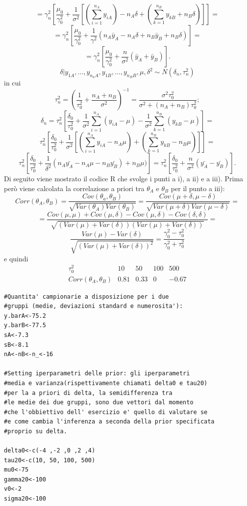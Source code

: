 \begin{itemize}[-]
\[
=\gamma_n^2[\frac{\mu_0}{\gamma_0^2}+\frac{1}{\sigma^2}[(\sum_{i=1}^{n_A}y_{iA}) - n_A\delta + (\sum_{k=1}^{n_B}y_{kB} + n_B\delta)]]=
\]
\[
= \gamma_n^2[\frac{\mu_0}{\gamma_0^2}+\frac{1}{\gamma^2}(n_A\bar{y}_A-n_A\delta+n_B\bar{y}_B+n_B\delta)] = 
\]
\[
=\gamma_n^2[\frac{\mu_0}{\gamma_0^2}+\frac{n}{\sigma^2}(\bar{y}_A+\bar{y}_B)].
\]
\[
\delta | y_{1A},\dots,y_{n_aA},y_{1B},\dots,y_{n_BB},\mu,\delta^2 \sim N(\delta_n,\tau_n^2)
\]
in cui
\[
\tau_n^2 = (\frac{1}{\tau_0^2}+\frac{n_A+n_B}{\sigma^2})^{-1} = \frac{\sigma^2\tau_0^2}{\sigma^2+(n_A+n_B)\tau_0^2};
\]
\[
\delta_n = \tau_n^2[\frac{\delta_0}{\tau_0^2}+\frac{1}{\sigma^2}\sum_{i=1}^{n_A}(y_{iA}-\mu)-\frac{1}{\sigma^2}\sum_{k=1}^{n_B}(y_{kB}-\mu)]=
\]
\[
\tau_n^2[\frac{\delta_0}{\tau_0^2}+\frac{1}{\sigma^2}[(\sum_{i=1}^{n_A}y_{iA}-n_A\mu)+(\sum_{k=1}^{n_B}y_{kB}-n_B\mu)]]=
\]
\[
\tau_n^2[\frac{\delta_0}{\tau_0^2}+\frac{1}{\delta^2}(n_A\bar{y_A}-n_A\mu-n_B\bar{y_B})+n_B\mu)]=\tau_n^2[\frac{\delta_0}{\tau_0^2}+\frac{n}{\sigma^2}(\bar{y_A}-\bar{y_B})].
\]
Di seguito viene mostrato il codice R che svolge i punti a i), a ii) e a iii). Prima però viene calcolata la correlazione a priori tra $\theta_A$ e $\theta_B$ per il punto a iii):
\[
Corr(\theta_A,\theta_B) = \frac{Cov(\theta_a,\theta_B)}{\sqrt{Var(\theta_A)Var(\theta_B)}} = \frac{Cov(\mu+\delta,\mu-\delta)}{\sqrt{Var(\mu+\delta)Var(\mu-\delta)}}=
\]
\[
= \frac{Cov(\mu,\mu)+Cov(\mu,\delta)-Cov(\mu,\delta)-Cov(\delta,\delta)}{\sqrt{(Var(\mu)+Var(\delta))(Var(\mu)+Var(\delta))}}=
\]
\[
\frac{Var(\mu)-Var(\delta)}{\sqrt{(Var(\mu)+Var(\delta))^2}}
=\frac{\gamma_0^2-\tau_0^2}{\gamma_0^2+\tau_0^2}
\]
e quindi
\[
 \begin{matrix}
  \tau_0^2 & 10 & 50 & 100 & 500 \\
  Corr(\theta_A,\theta_B) & 0.81 & 0.33 & 0 & -0.67
 \end{matrix}
\]

\begin{lstlisting}[style=R]
#Quantita' campionarie a disposizione per i due
#gruppi (medie, deviazioni standard e numerosita'):
y.barA<-75.2
y.barB<-77.5
sA<-7.3
sB<-8.1
nA<-nB<-n_<-16

#Setting iperparametri delle prior: gli iperparametri 
#media e varianza(rispettivamente chiamati delta0 e tau20) 
#per la a priori di delta, la semidifferenza tra
#le medie dei due gruppi, sono due vettori dal momento
#che l'obbiettivo dell' esercizio e' quello di valutare se 
#e come cambia l'inferenza a seconda della prior specificata 
#proprio su delta.

delta0<-c(-4 ,-2 ,0 ,2 ,4)
tau20<-c(10, 50, 100, 500)
mu0<-75
gamma20<-100
v0<-2
sigma20<-100


\end{lstlisting}
\end{itemize}
